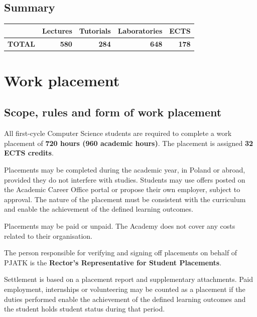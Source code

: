 \documentclass[12pt,a4paper]{article}
\begin{document}
\subsection*{Summary}

\begin{tabular}{lrrrr}
\toprule
\rowcolor{pjatkRed} {\color{white}} & {\color{white}\textbf{Lectures}} & {\color{white}\textbf{Tutorials}} & {\color{white}\textbf{Laboratories}} & {\color{white}\textbf{ECTS}} \\
\midrule
\textbf{TOTAL} & \textbf{580} & \textbf{284} & \textbf{648} & \textbf{178} \\
\bottomrule
\end{tabular}



\newpage

\section{Work placement}

\subsection*{Scope, rules and form of work placement}

All first-cycle Computer Science students are required to complete a work placement of \textbf{720 hours (960 academic hours)}. The placement is assigned \textbf{32 ECTS credits}.

Placements may be completed during the academic year, in Poland or abroad, provided they do not interfere with studies. Students may use offers posted on the Academic Career Office portal or propose their own employer, subject to approval. The nature of the placement must be consistent with the curriculum and enable the achievement of the defined learning outcomes.

Placements may be paid or unpaid. The Academy does not cover any costs related to their organisation.

The person responsible for verifying and signing off placements on behalf of PJATK is the \textbf{Rector's Representative for Student Placements}.

Settlement is based on a placement report and supplementary attachments. Paid employment, internships or volunteering may be counted as a placement if the duties performed enable the achievement of the defined learning outcomes and the student holds student status during that period.
\end{document}
